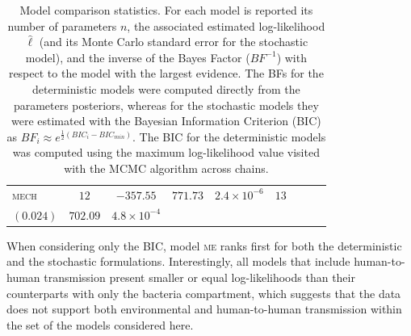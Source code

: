 \begin{table}[h!]
\begin{tabular}{lcccccccc}
  \textsc{mech} &  $12$ & $-357.55$ & $771.73$ & $2.4\times 10^{-6}$ &  $13$ & \makecell{$-320.38$\vspace{-.1cm} \\ \scriptsize{$(0.024)$}} & $702.09$ & $4.8\times 10^{-4}$ \\ 
   \bottomrule
\end{tabular}
\caption[Model comparison statistics]{Model comparison statistics. For each model is reported its number of parameters $n$, the associated estimated log-likelihood $\hat{\ell}$ (and its Monte Carlo standard error for the stochastic model), and the inverse of the Bayes Factor ($BF^{-1}$) with respect to the model with the largest evidence. The BFs for the deterministic models were computed directly from the parameters posteriors, whereas for the stochastic models they were estimated with the Bayesian Information Criterion (BIC) as $BF_{i} \approx e^{\frac{1}{2} \left( BIC_i - BIC_{min}\right)}$. The BIC for the deterministic models was computed using the maximum log-likelihood value visited with the MCMC algorithm across chains.}\label{tab:stats}
\end{table}
When considering only the BIC, model \textsc{me} ranks first for both the deterministic and the stochastic formulations. Interestingly, all models that include human-to-human transmission present smaller or equal log-likelihoods than their counterparts with only the bacteria compartment, which suggests that the data does not support both environmental and human-to-human transmission within the set of the models considered here.

